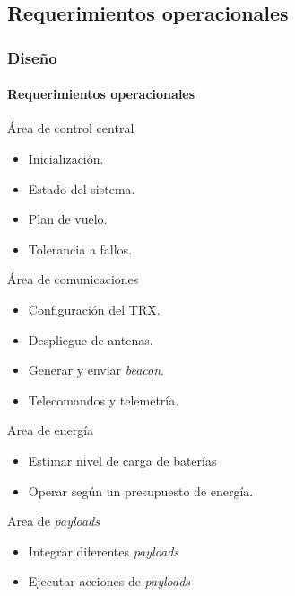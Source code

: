 \documentclass[xcolor=dvipsnames]{beamer}
\begin{document}
    \subsection{Requerimientos operacionales}
    \begin{frame}
        \frametitle{Diseño}
        \framesubtitle{Requerimientos operacionales}
        
        \begin{block}{Área de control central}
            \begin{itemize}
                \item Inicialización.
                \item Estado del sistema.
                \item Plan de vuelo.
                \item Tolerancia a fallos.
            \end{itemize}
        \end{block}
        
        \begin{block}{Área de comunicaciones}
            \begin{itemize}
                \item Configuración del TRX.
                \item Despliegue de antenas.
                \item Generar y enviar \textit{beacon}.
                \item Telecomandos y telemetría.
            \end{itemize}
        \end{block}
        
        \begin{block}{Area de energía}
            \begin{itemize}
                \item Estimar nivel de carga de baterías
                \item Operar según un presupuesto de energía.
            \end{itemize}
        \end{block}
        
        \begin{block}{Area de \textit{payloads}}
            \begin{itemize}
                \item Integrar diferentes \textit{payloads}
                \item Ejecutar acciones de \textit{payloads}
            \end{itemize}
        \end{block}
    \end{frame}
\end{document}
